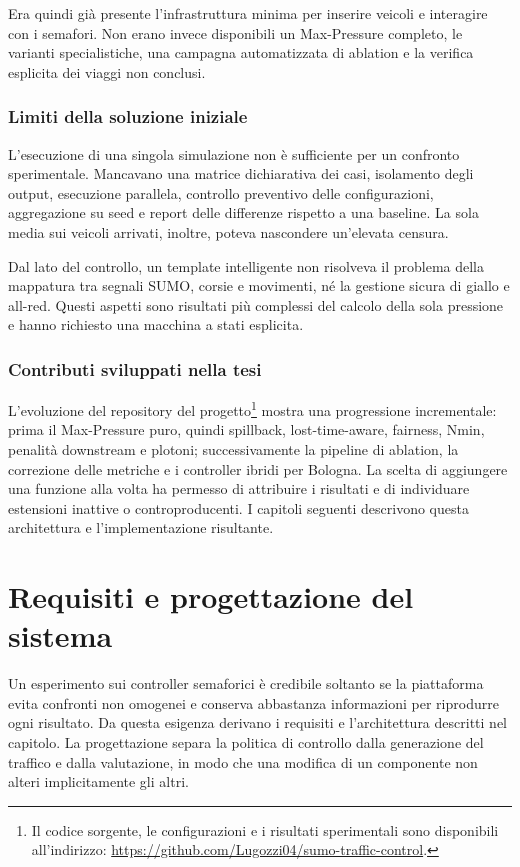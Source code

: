 \documentclass[12pt,a4paper,oneside]{report}
\numberwithin{equation}{chapter}
\begin{document}
Era quindi già presente l'infrastruttura minima per inserire veicoli e
interagire con i semafori. Non erano invece disponibili un Max-Pressure
completo, le varianti specialistiche, una campagna automatizzata di ablation e
la verifica esplicita dei viaggi non conclusi.

\subsection{Limiti della soluzione iniziale}

L'esecuzione di una singola simulazione non è sufficiente per un confronto
sperimentale. Mancavano una matrice dichiarativa dei casi, isolamento degli
output, esecuzione parallela, controllo preventivo delle configurazioni,
aggregazione su seed e report delle differenze rispetto a una baseline. La
sola media sui veicoli arrivati, inoltre, poteva nascondere un'elevata censura.

Dal lato del controllo, un template intelligente non risolveva il problema
della mappatura tra segnali SUMO, corsie e movimenti, né la gestione sicura di
giallo e all-red. Questi aspetti sono risultati più complessi del calcolo della
sola pressione e hanno richiesto una macchina a stati esplicita.

\subsection{Contributi sviluppati nella tesi}

L'evoluzione del repository del progetto\footnote{Il codice sorgente, le
configurazioni e i risultati sperimentali sono disponibili all'indirizzo:
\url{https://github.com/Lugozzi04/sumo-traffic-control}.} mostra una progressione incrementale: prima il
Max-Pressure puro, quindi spillback, lost-time-aware, fairness, Nmin, penalità
downstream e plotoni; successivamente la pipeline di ablation, la correzione
delle metriche e i controller ibridi per Bologna. La scelta di aggiungere una
funzione alla volta ha permesso di attribuire i risultati e di individuare
estensioni inattive o controproducenti. I capitoli seguenti descrivono questa
architettura e l'implementazione risultante.

\chapter{Requisiti e progettazione del sistema}
\label{chap:progettazione}

Un esperimento sui controller semaforici è credibile soltanto se la piattaforma
evita confronti non omogenei e conserva abbastanza informazioni per
riprodurre ogni risultato. Da questa esigenza derivano i requisiti e
l'architettura descritti nel capitolo. La progettazione separa la politica di
controllo dalla generazione del traffico e dalla valutazione, in modo che una
modifica di un componente non alteri implicitamente gli altri.
\end{document}
